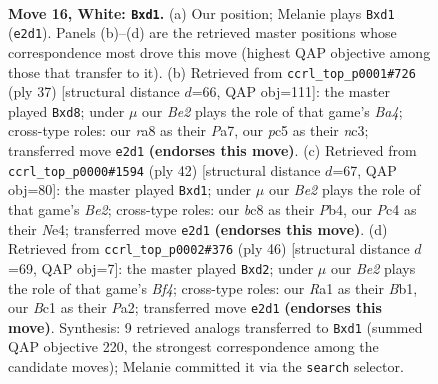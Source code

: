 \documentclass[11pt]{article}
\begin{document}
\clearpage

\begin{figure}[p]\centering
\begin{subfigure}{0.46\textwidth}\centering
\resizebox{\linewidth}{!}{%
\newchessgame
\chessboard[
  setfen={rnb3k1/pp6/6p1/2p2p1p/2P5/2P5/P3BPPP/R1Br2K1 w - - 0 16},
  showmover=false,
  pgfstyle=straightmove, color=movearrow, markmove={e2-d1}
]}
\caption{}
\end{subfigure}\hfill
\begin{subfigure}{0.46\textwidth}\centering
\resizebox{\linewidth}{!}{%
\newchessgame
\chessboard[
  setfen={r1bR2k1/pp3pp1/4p2p/b7/8/2N1P1P1/PP2P1BP/2R3K1 b - - 0 19},
  showmover=false,
  pgfstyle=straightmove, color=movearrow, markmove={a5-d8}
]}
\caption{}
\end{subfigure}
\\[4pt]
\begin{subfigure}{0.46\textwidth}\centering
\resizebox{\linewidth}{!}{%
\newchessgame
\chessboard[
  setfen={r5k1/1p3pp1/p1n1b2p/4p3/PP2N3/4P3/1R2BPPP/3r2K1 w - - 0 22},
  showmover=false,
  pgfstyle=straightmove, color=movearrow, markmove={e2-d1}
]}
\caption{}
\end{subfigure}\hfill
\begin{subfigure}{0.46\textwidth}\centering
\resizebox{\linewidth}{!}{%
\newchessgame
\chessboard[
  setfen={5k2/6p1/p3b2p/1p3p2/5B2/P7/P2rnPPP/1B5K w - - 0 24},
  showmover=false,
  pgfstyle=straightmove, color=movearrow, markmove={f4-d2}
]}
\caption{}
\end{subfigure}
\caption{\textbf{Move 16, White: \texttt{Bxd1}.} (a) Our position; Melanie plays \texttt{Bxd1} (\texttt{e2d1}). Panels (b)--(d) are the retrieved master positions whose correspondence most drove this move (highest QAP objective among those that transfer to it). (b) Retrieved from \texttt{ccrl\_top\_p0001\#726} (ply 37) [structural distance $d$=66, QAP obj=111]: the master played \texttt{Bxd8}; under $\mu$ our \emph{Be2} plays the role of that game's \emph{Ba4}; cross-type roles: our \emph{r}a8 as their \emph{P}a7, our \emph{p}c5 as their \emph{n}c3; transferred move \texttt{e2d1} \textbf{(endorses this move)}. (c) Retrieved from \texttt{ccrl\_top\_p0000\#1594} (ply 42) [structural distance $d$=67, QAP obj=80]: the master played \texttt{Bxd1}; under $\mu$ our \emph{Be2} plays the role of that game's \emph{Be2}; cross-type roles: our \emph{b}c8 as their \emph{P}b4, our \emph{P}c4 as their \emph{N}e4; transferred move \texttt{e2d1} \textbf{(endorses this move)}. (d) Retrieved from \texttt{ccrl\_top\_p0002\#376} (ply 46) [structural distance $d$=69, QAP obj=7]: the master played \texttt{Bxd2}; under $\mu$ our \emph{Be2} plays the role of that game's \emph{Bf4}; cross-type roles: our \emph{R}a1 as their \emph{B}b1, our \emph{B}c1 as their \emph{P}a2; transferred move \texttt{e2d1} \textbf{(endorses this move)}. Synthesis: 9 retrieved analogs transferred to \texttt{Bxd1} (summed QAP objective 220, the strongest correspondence among the candidate moves); Melanie committed it via the \texttt{search} selector.}
\label{fig:thought-m30}
\end{figure}
\end{document}
